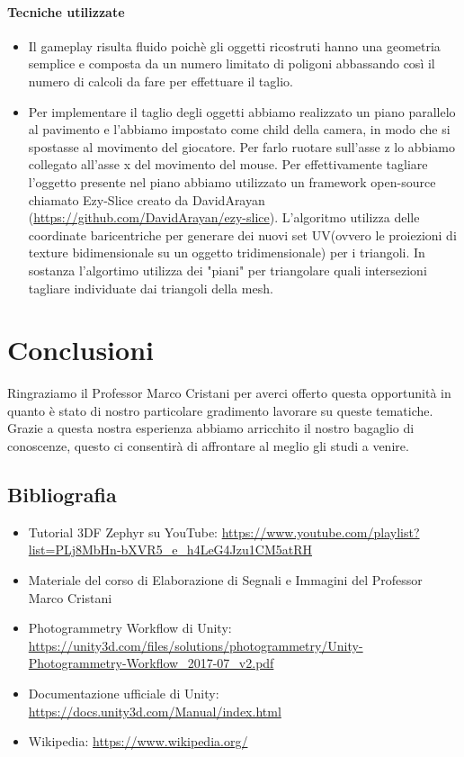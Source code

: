 \documentclass[12pt]{report}
\begin{document}
\subsubsection*{Tecniche utilizzate}
\begin{itemize}
    \item Il gameplay risulta fluido poich\`e gli oggetti ricostruti hanno una geometria semplice e composta da un numero limitato di poligoni abbassando così il numero di calcoli da fare per effettuare il taglio.
    \item Per implementare il taglio degli oggetti abbiamo realizzato un piano parallelo al pavimento e l'abbiamo impostato come child della camera, in modo che si spostasse al movimento del giocatore.
    Per farlo ruotare sull'asse z lo abbiamo collegato all'asse x del movimento del mouse. Per effettivamente tagliare l'oggetto presente nel piano abbiamo utilizzato un framework open-source chiamato Ezy-Slice creato da DavidArayan (\url{https://github.com/DavidArayan/ezy-slice}).
    L'algoritmo utilizza delle coordinate baricentriche per generare dei nuovi set UV(ovvero le proiezioni di texture bidimensionale su un oggetto tridimensionale) per i triangoli. In sostanza l'algortimo utilizza dei "piani" per triangolare quali intersezioni tagliare individuate dai triangoli della mesh.
    
\end{itemize}

\chapter{Conclusioni}
Ringraziamo il Professor Marco Cristani per averci offerto questa opportunità in quanto è stato di nostro particolare gradimento lavorare su queste tematiche. Grazie a questa nostra esperienza abbiamo arricchito il nostro bagaglio di conoscenze, questo ci consentirà di affrontare al meglio gli studi a venire.

\section{Bibliografia}
\begin{itemize}
    \item Tutorial 3DF Zephyr su YouTube: \url{https://www.youtube.com/playlist?list=PLj8MbHn-bXVR5_e_h4LeG4Jzu1CM5atRH}
    \item Materiale del corso di Elaborazione di Segnali e Immagini del Professor Marco Cristani
    \item Photogrammetry Workflow di Unity: \url{https://unity3d.com/files/solutions/photogrammetry/Unity-Photogrammetry-Workflow_2017-07_v2.pdf}
    \item Documentazione ufficiale di Unity: \url{https://docs.unity3d.com/Manual/index.html}
    \item Wikipedia: \url{https://www.wikipedia.org/}
\end{itemize}
\end{document}
